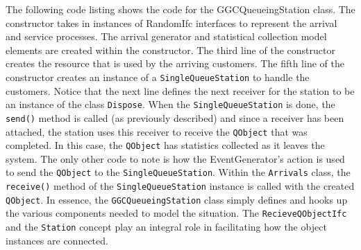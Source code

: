 \documentclass[
]{book}
\theoremstyle{definition}
\theoremstyle{definition}
\theoremstyle{definition}
\theoremstyle{definition}
\theoremstyle{remark}
\begin{document}
The following code listing shows the code for the GGCQueueingStation
class. The constructor takes in instances of RandomIfc interfaces to
represent the arrival and service processes. The arrival generator and
statistical collection model elements are created within the constructor.
The third line of the constructor creates the resource that is used by the arriving customers.
The fifth line of the constructor creates an instance of a \texttt{SingleQueueStation} to handle the
customers. Notice that the next line defines the next receiver for the station
to be an instance of the class \texttt{Dispose}. When the \texttt{SingleQueueStation} is
done, the \texttt{send()} method is called (as previously described) and since a
receiver has been attached, the station uses this receiver to receive
the \texttt{QObject} that was completed. In this case, the \texttt{QObject} has statistics
collected as it leaves the system. The only other code
to note is how the EventGenerator's action is used to send the \texttt{QObject}
to the \texttt{SingleQueueStation}. Within the \texttt{Arrivals} class, the \texttt{receive()} method of the \texttt{SingleQueueStation} instance is called with the created \texttt{QObject}. In essence, the
\texttt{GGCQueueingStation} class simply defines and hooks up the various
components needed to model the situation. The \texttt{RecieveQObjectIfc} and the
\texttt{Station} concept play an integral role in facilitating how the object
instances are connected.
\end{document}
